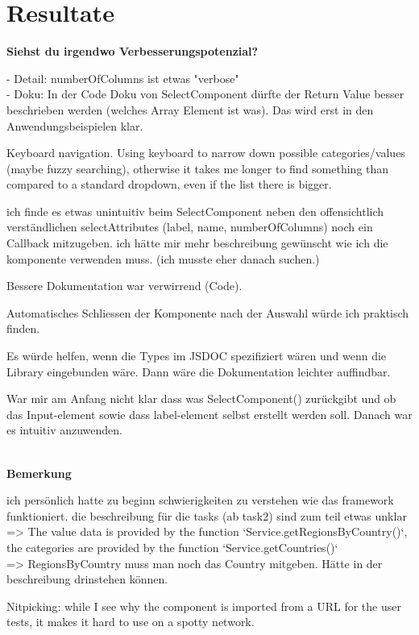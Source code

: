 \section*{Resultate}
\noindent
\textbf{Siehst du irgendwo Verbesserungspotenzial?}

\noindent 
- Detail: numberOfColumns ist etwas "verbose"
\\
- Doku: In der Code Doku von SelectComponent dürfte der Return Value besser beschrieben werden (welches Array Element ist was). 
Das wird erst in den Anwendungsbeispielen klar. 

Keyboard navigation. Using keyboard to narrow down possible categories/values (maybe fuzzy searching), 
otherwise it takes me longer to find something than compared to a standard dropdown, even if the list there is bigger.

ich finde es etwas unintuitiv beim SelectComponent neben den offensichtlich verständlichen selectAttributes (label, name, numberOfColumns) noch ein Callback mitzugeben.
ich hätte mir mehr beschreibung gewünscht wie ich die komponente verwenden muss. (ich musste eher danach suchen.)

Bessere Dokumentation war verwirrend (Code).

Automatisches Schliessen der Komponente nach der Auswahl würde ich praktisch finden.

Es würde helfen, wenn die Types im JSDOC spezifiziert wären und wenn die Library eingebunden wäre. 
Dann wäre die Dokumentation leichter auffindbar.

War mir am Anfang nicht klar dass was SelectComponent() zurückgibt und ob das Input-element sowie dass label-element selbst erstellt werden soll. 
Danach war es intuitiv anzuwenden.

 \\

\noindent
\textbf{Bemerkung}

ich persönlich hatte zu beginn schwierigkeiten zu verstehen wie das framework funktioniert. 
die beschreibung für die tasks (ab task2) sind zum teil etwas unklar 
\\
=> The value data is provided by the function `Service.getRegionsByCountry()`, 
the categories are provided by the function `Service.getCountries()`  
\\
=> RegionsByCountry muss man noch das Country mitgeben. 
Hätte in der beschreibung drinstehen können.

Nitpicking: while I see why the component is imported from a URL for the user tests, it makes it hard to use on a spotty network.

